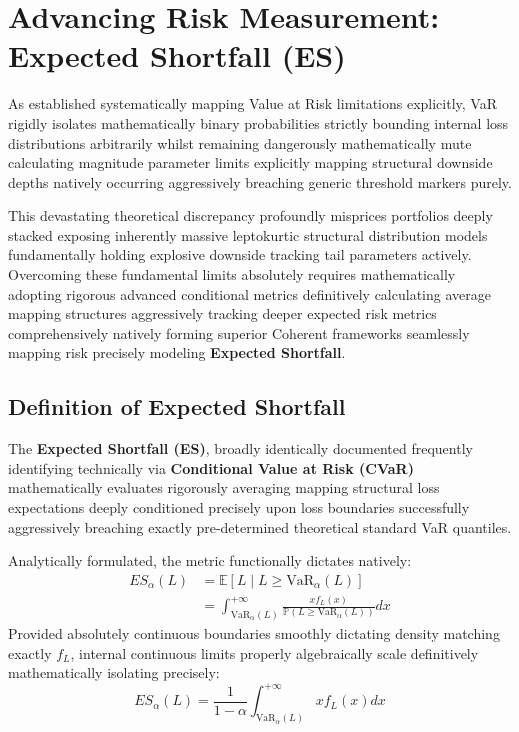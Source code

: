 \chapter{Advancing Risk Measurement: Expected Shortfall (ES)}

As established systematically mapping Value at Risk limitations explicitly, VaR rigidly isolates mathematically binary probabilities strictly bounding internal loss distributions arbitrarily whilst remaining dangerously mathematically mute calculating magnitude parameter limits explicitly mapping structural downside depths natively occurring aggressively breaching generic threshold markers purely. 

This devastating theoretical discrepancy profoundly misprices portfolios deeply stacked exposing inherently massive leptokurtic structural distribution models fundamentally holding explosive downside tracking tail parameters actively. Overcoming these fundamental limits absolutely requires mathematically adopting rigorous advanced conditional metrics definitively calculating average mapping structures aggressively tracking deeper expected risk metrics comprehensively natively forming superior Coherent frameworks seamlessly mapping risk precisely modeling \textbf{Expected Shortfall}.

\section{Definition of Expected Shortfall}

\begin{definition}
The \textbf{Expected Shortfall (ES)}, broadly identically documented frequently identifying technically via \textbf{Conditional Value at Risk (CVaR)} mathematically evaluates rigorously averaging mapping structural loss expectations deeply conditioned precisely upon loss boundaries successfully aggressively breaching exactly pre-determined theoretical standard VaR quantiles.

Analytically formulated, the metric functionally dictates natively:
\begin{align*}
    ES_\alpha(L) &= \mathbb{E}[L \mid L \geq \text{VaR}_\alpha(L)] \\
    &= \int_{\text{VaR}_\alpha(L)}^{+\infty} \frac{x f_L(x)}{\mathbb{P}(L \geq \text{VaR}_\alpha(L))} dx 
\end{align*}
Provided absolutely continuous boundaries smoothly dictating density matching exactly $f_L$, internal continuous limits properly algebraically scale definitively mathematically isolating precisely:
$$
ES_\alpha(L) = \frac{1}{1 - \alpha} \int_{\text{VaR}_\alpha(L)}^{+\infty} x f_L(x) dx
$$
\end{definition}

